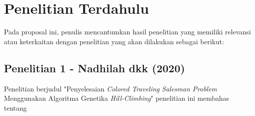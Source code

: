 \section{Penelitian Terdahulu}

Pada proposal ini, penulis mencantumkan hasil penelitian yang memiliki relevansi atau keterkaitan dengan penelitian yang akan dilakukan sebagai berikut:

\subsection{Penelitian 1 - Nadhilah dkk (2020)}

Penelitian berjudul "Penyelesaian \textit{Colored Traveling Salesman Problem} Menggunakan Algoritma Genetika \textit{Hill-Climbing}" penelitian ini membahas tentang